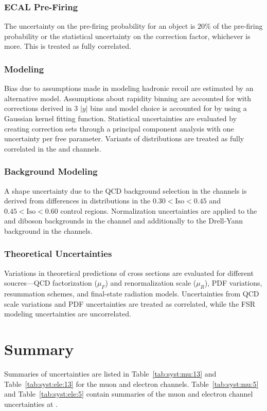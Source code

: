 \subsubsection{ECAL Pre-Firing}
The uncertainty on the pre-firing probability for an object is $20\%$ of the pre-firing probability or the statistical uncertainty on the correction factor, whichever is more. This is treated as fully correlated.

\subsubsection{\met Modeling}
Bias due to assumptions made in modeling hadronic recoil are estimated by an alternative model. Assumptions about rapidity binning are accounted for with corrections derived in 3 $|y|$ bins and model choice is accounted for by using a Gaussian kernel fitting function. Statistical uncertainties are evaluated by creating correction sets through a principal component analysis with one uncertainty per free parameter. Variants of \mt distributions are treated as fully correlated in the \Wp and \Wm channels.

\subsubsection{Background Modeling}
A shape uncertainty due to the QCD background selection in the \W channels is derived from differences in \mt distributions in the $0.30 < \mathrm{Iso} <  0.45$ and $0.45 < \mathrm{Iso} <  0.60$ control regions. Normalization uncertainties are applied to the \ttbar and diboson backgrounds in the \Z channel and additionally to the Drell-Yann background in the \W channels.

\subsubsection{Theoretical Uncertainties}
Variations in theoretical predictions of cross sections are evaluated for different soucres---QCD factorization ($\mu_F$) and renormalization scale ($\mu_R$), PDF variations, resummation schemes, and final-state radiation models. Uncertainties from QCD scale variations and PDF uncertainties are treated as correlated, while the FSR modeling uncertainties are uncorrelated.

\section{Summary}
Summaries of uncertainties are listed in Table~\ref{tab:syst:mu:13}  and Table~\ref{tab:syst:ele:13} for the \serah muon and electron channels. Table~\ref{tab:syst:mu:5} and Table~\ref{tab:syst:ele:5} contain summaries of the muon and electron channel uncertainties at \serag.







